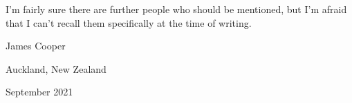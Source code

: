 I'm fairly sure there are further people who should be mentioned, but I'm afraid that I can't recall them specifically at the time of writing.




\vspace{1cm}
\hfill James Cooper

\hfill Auckland, New Zealand

\hfill September 2021

